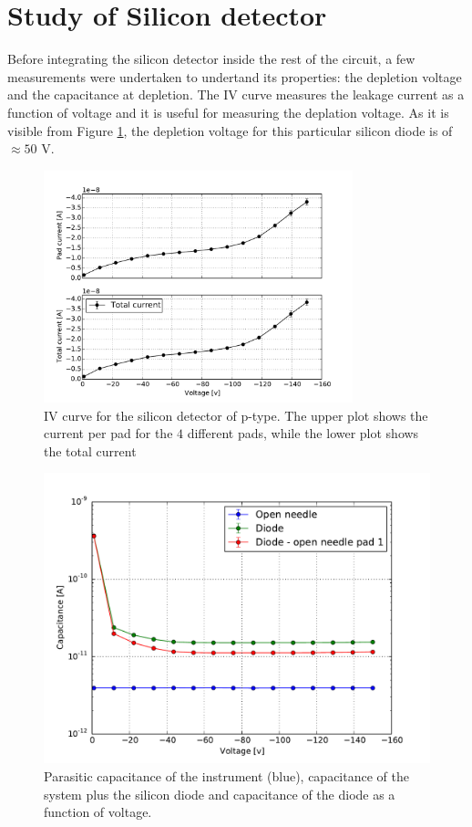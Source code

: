 \documentclass[12pt]{article}
\begin{document}
\section{Study of Silicon detector}

Before integrating the silicon detector inside the rest of the circuit, a few measurements were undertaken to undertand its properties: the depletion voltage and the capacitance at depletion. The IV curve measures the leakage current as a function of voltage and it is useful for measuring the deplation voltage. As it is visible from Figure \ref{fig:IVcurve}, the depletion voltage for this particular silicon diode is of $\approx 50$ V.

\begin{figure}[htb]
  \centering
  \includegraphics[width=0.8\textwidth]{./graphics/IV_V_vs_A.pdf}
  \caption{IV curve for the silicon detector of p-type. The upper plot shows the current per pad for the $4$ different pads, while the lower plot shows the total current }
  \label{fig:IVcurve}
\end{figure}

\begin{figure}[t!]
  \centering
  \includegraphics[width=1.2\textwidth]{./graphics/V_vs_C}
  \caption{Parasitic capacitance of the instrument (blue), capacitance of the system plus the silicon diode and capacitance of the diode as a function of voltage.}
  \label{fig:VC_curve_single}
\end{figure}
\end{document}
